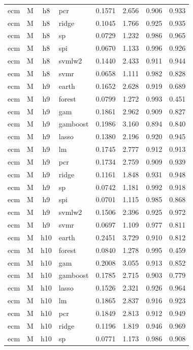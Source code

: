 \begin{ThreePartTable}
\begin{longtable}[t]{llclcccc}
ecm & M & h8 & pcr & 0.1571 & 2.656 & 0.906 & 0.933\\
ecm & M & h8 & ridge & 0.1045 & 1.766 & 0.925 & 0.935\\
ecm & M & h8 & sp & 0.0729 & 1.232 & 0.986 & 0.965\\
ecm & M & h8 & spi & 0.0670 & 1.133 & 0.996 & 0.926\\
ecm & M & h8 & svmlw2 & 0.1440 & 2.433 & 0.911 & 0.944\\
ecm & M & h8 & svmr & 0.0658 & 1.111 & 0.982 & 0.828\\
\addlinespace
ecm & M & h9 & earth & 0.1652 & 2.628 & 0.919 & 0.689\\
ecm & M & h9 & forest & 0.0799 & 1.272 & 0.993 & 0.451\\
ecm & M & h9 & gam & 0.1861 & 2.962 & 0.909 & 0.827\\
ecm & M & h9 & gamboost & 0.1986 & 3.160 & 0.894 & 0.840\\
ecm & M & h9 & lasso & 0.1380 & 2.196 & 0.920 & 0.945\\
ecm & M & h9 & lm & 0.1745 & 2.777 & 0.912 & 0.913\\
ecm & M & h9 & pcr & 0.1734 & 2.759 & 0.909 & 0.939\\
ecm & M & h9 & ridge & 0.1161 & 1.848 & 0.931 & 0.948\\
ecm & M & h9 & sp & 0.0742 & 1.181 & 0.992 & 0.918\\
ecm & M & h9 & spi & 0.0701 & 1.115 & 0.985 & 0.868\\
ecm & M & h9 & svmlw2 & 0.1506 & 2.396 & 0.925 & 0.972\\
ecm & M & h9 & svmr & 0.0697 & 1.109 & 0.977 & 0.811\\
\addlinespace
ecm & M & h10 & earth & 0.2451 & 3.729 & 0.910 & 0.812\\
ecm & M & h10 & forest & 0.0840 & 1.278 & 0.995 & 0.459\\
ecm & M & h10 & gam & 0.2008 & 3.055 & 0.913 & 0.852\\
ecm & M & h10 & gamboost & 0.1785 & 2.715 & 0.903 & 0.779\\
ecm & M & h10 & lasso & 0.1526 & 2.321 & 0.926 & 0.964\\
ecm & M & h10 & lm & 0.1865 & 2.837 & 0.916 & 0.923\\
ecm & M & h10 & pcr & 0.1849 & 2.813 & 0.912 & 0.949\\
ecm & M & h10 & ridge & 0.1196 & 1.819 & 0.946 & 0.969\\
ecm & M & h10 & sp & 0.0771 & 1.173 & 0.986 & 0.908\\

\end{longtable}
\end{ThreePartTable}
